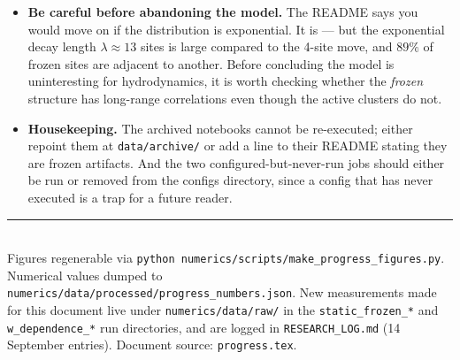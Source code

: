 \documentclass[11pt,a4paper]{article}
\begin{document}
\begin{itemize}
\item \textbf{Be careful before abandoning the model.} The README says you
would move on if the distribution is exponential. It is --- but the
exponential decay length $\lambda\approx13$ sites is large compared to the
4-site move, and $89\%$ of frozen sites are adjacent to another. Before
concluding the model is uninteresting for hydrodynamics, it is worth
checking whether the \emph{frozen} structure has long-range correlations
even though the active clusters do not.

\item \textbf{Housekeeping.} The archived notebooks cannot be re-executed;
either repoint them at \texttt{data/archive/} or add a line to their README
stating they are frozen artifacts. And the two configured-but-never-run
jobs should either be run or removed from the configs directory, since a
config that has never executed is a trap for a future reader.
\end{itemize}

\vfill
\noindent\rule{\textwidth}{0.4pt}\\
{\footnotesize
Figures regenerable via
\texttt{python numerics/scripts/make\_progress\_figures.py}.
Numerical values dumped to
\texttt{numerics/data/processed/progress\_numbers.json}.
New measurements made for this document live under
\texttt{numerics/data/raw/} in the
\texttt{static\_frozen\_*} and \texttt{w\_dependence\_*} run directories,
and are logged in \texttt{RESEARCH\_LOG.md} (14 September entries).
Document source: \texttt{progress.tex}.}
\end{document}
